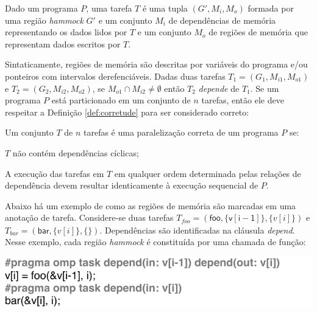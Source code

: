 \documentclass[sigplan,10pt,review]{acmart}
\begin{document}
\begin{definition} [Tarefa]
\label{def:task}
Dado um programa $P$, uma tarefa $T$ é uma tupla $(G', M_i, M_o)$ formada
por uma região \textit{hammock} $G'$ e um conjunto $M_i$ de dependências de memória representando
os dados lidos por $T$ e um conjunto $M_o$ de regiões de memória que representam dados escritos por $T$.
\end{definition}

Sintaticamente, regiões de memória são descritas por variáveis do programa e/ou ponteiros com intervalos derefenciáveis.
Dadas duas tarefas $T_1 = (G_1, M_{i1}, M_{o1})$ e $T_2 = (G_2, M_{i2}, M_{o2})$, 
se $M_{o1} \cap M_{i2} \neq \emptyset$ então $T_2$ {\em depende} de $T_1$. Se um programa $P$ está particionado em um 
conjunto de $n$ tarefas, então ele deve respeitar a Definição \ref{def:corretude} para ser considerado correto:

\begin{definition} [Corretude]
\label{def:corretude}
Um conjunto $T$ de $n$ tarefas é uma paralelização correta de um programa $P$ se:
\begin{compactenum}
\item $T$ não contém dependências cíclicas;
\item A execução das tarefas em $T$ em qualquer ordem determinada pelas relações de dependência devem resultar
identicamente à execução sequencial de $P$.
\end{compactenum}
\end{definition}

Abaixo há um exemplo de como as regiões de memória são marcadas em uma anotação de tarefa.
Considere-se duas tarefas $T_{\mathit{foo}} = (\mathsf{foo}, \{\mathsf{v[i - 1]}\},
\{v[i]\})$ e $T_{\mathit{bar}} = (\mathsf{bar}, \{v[i]\}, \{\})$. Dependências são identificadas na cláusula \textit{depend}. 
Nesse exemplo, cada região \textit{hammock} é constituída por uma chamada de função:

\includegraphics[width=1\columnwidth]{images/ex_depends}
\end{document}
